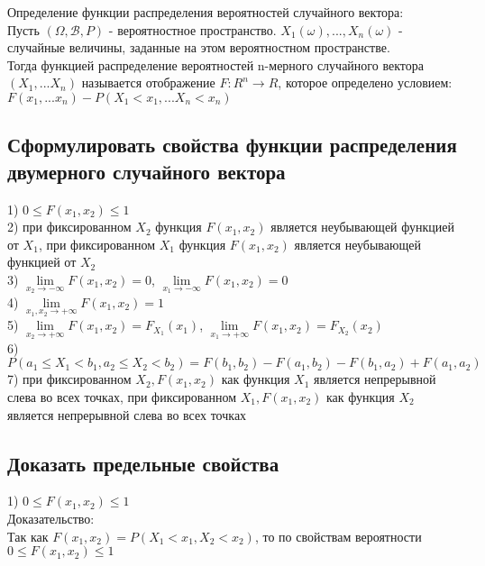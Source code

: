 Определение функции распределения вероятностей случайного вектора:\\
Пусть $(\Omega, \mathcal{B}, P)$ - вероятностное пространство. $X_{1}(\omega), ... , X_{n}(\omega)$ - случайные величины, заданные на этом вероятностном пространстве.\\
Тогда функцией распределение вероятностей n-мерного случайного вектора $(X_{1}, ... X_{n})$ называется отображение $F : R^{n} \rightarrow R$, которое определено условием:\\
$F(x_{1}, ... x_{n}) - P(X_{1} < x_{1}, ... X_{n} < x_{n})$\\

\subsection{Сформулировать свойства функции распределения двумерного случайного вектора}
1) $0 \leqslant F(x_{1}, x_{2}) \leqslant 1$\\
2) при фиксированном $X_{2}$ функция $F(x_{1}, x_{2})$ является неубывающей функцией от $X_{1}$, при фиксированном $X_{1}$ функция $F(x_{1}, x_{2})$ является неубывающей функцией от $X_{2}$\\
3) $\lim\limits_{x_{2} \rightarrow -\infty} F(x_{1}, x_{2}) = 0$, $\lim\limits_{x_{1} \rightarrow -\infty} F(x_{1}, x_{2}) = 0$\\
4) $\lim\limits_{x_{1}, x_{2} \rightarrow +\infty} F(x_{1}, x_{2}) = 1$\\
5) $\lim\limits_{x_{2} \rightarrow +\infty} F(x_{1}, x_{2}) = F_{X_1} (x_{1})$, $\lim\limits_{x_{1} \rightarrow +\infty} F(x_{1}, x_{2}) =  F_{X_2} (x_{2})$\\
6) $P(a_{1} \leqslant X_{1} < b_{1}, a_{2} \leqslant X_{2} < b_{2}) = F(b_{1}, b_{2}) - F(a_{1}, b_{2}) - F(b_{1}, a_{2}) + F(a_{1}, a_{2})$\\
7) при фиксированном $X_{2}, F(x_{1}, x_{2})$ как функция $X_{1}$ является непрерывной слева во всех точках, при фиксированном $X_{1}, F(x_{1}, x_{2})$ как функция $X_{2}$ является непрерывной слева во всех точках\\

\subsection{Доказать предельные свойства}
1) $0 \leqslant F(x_{1}, x_{2}) \leqslant 1$\\
Доказательство:\\
Так как $F(x_{1}, x_{2}) = P(X_{1} < x_{1}, X_{2} < x_{2})$, то по свойствам вероятности $0 \leqslant F(x_{1}, x_{2}) \leqslant 1$\\


